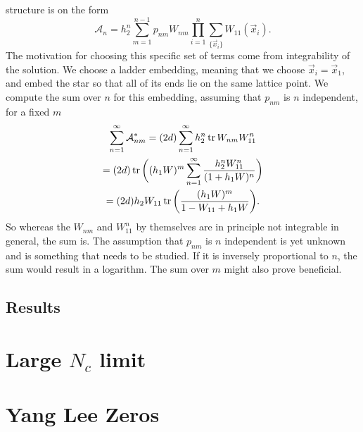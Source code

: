 structure is on the form
%
\begin{equation}
  \mathcal{A}_n = h_2^n \sum_{m=1}^{n-1} p_{nm} W_{nm} \prod_{i=1}^n
  \sum_{\{\vec{x}_i\}} W_{11}(\vec{x}_i).
\end{equation}
%
The motivation for choosing this specific set of terms come from integrability
of the solution. We choose a ladder embedding, meaning that we choose $\vec{x}_i
= \vec{x}_1$, and embed the star so that all of its ends lie on the same lattice
point. We compute the sum over $n$ for this embedding, assuming that $p_{nm}$ is
$n$ independent, for a fixed $m$
%
\begin{multline}
  \sum_{n=1}^{\infty} \mathcal{A}_{nm}^*
    = (2d) \sum_{n=1}^{\infty} h_2^n \operatorname{tr} W_{nm} W_{11}^n \\
    = (2d) \operatorname{tr} \bigg( (h_1 W)^m \sum_{n=1}^{\infty} \frac{h_2^n W_{11}^n}{(1 + h_1 W)^n} \bigg) \\
    = (2d) h_2 W_{11} \operatorname{tr}\bigg( \frac{(h_1 W)^m}{1 - W_{11} + h_1 W} \bigg).
\end{multline}
%
So whereas the $W_{nm}$ and $W_{11}^n$ by themselves are in principle not
integrable in general, the sum is. The assumption that $p_{nm}$ is $n$
independent is yet unknown and is something that needs to be studied. If it is
inversely proportional to $n$, the sum would result in a logarithm. The sum
over $m$ might also prove beneficial.



\subsection{Results}

\section{Large \texorpdfstring{$N_c$}{Nc} limit} \label{sec:large_nc_study}
\section{Yang Lee Zeros} \label{sec:yang_lee_zeros}
